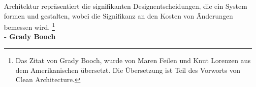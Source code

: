 
\thispagestyle{plain}
\begin{titlepage}

\begin{center}

\large{
    Architektur repräsentiert die signifikanten Designentscheidungen,
    die ein System formen und gestalten,
    wobei die Signifikanz an den Kosten von Änderungen bemessen wird.
    \footnote{Das Zitat von Grady Booch, wurde von Maren Feilen
    und Knut Lorenzen aus dem Amerikanischen übersetzt. Die Übersetzung ist Teil
    des Vorworts von Clean Architecture.\cite[S. 17]{RobertC.Martin2018}}
}\\[2ex]
\small{\textbf{- Grady Booch}}
\end{center}

\end{titlepage}

\restoregeometry
